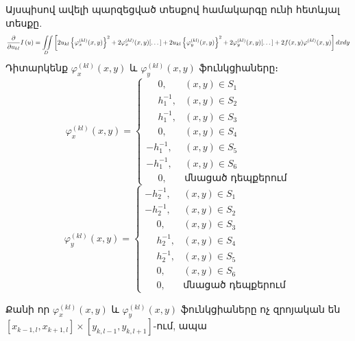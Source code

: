 \documentclass[fleqn, bachelor,subf,12pt,notitlepage]{article}
\newcommand\scalemath[2]{\scalebox{#1}{\mbox{\ensuremath{\displaystyle #2}}}}
\begin{document}
Այսպիսով ավելի պարզեցված տեսքով համակարգը ունի հետևյալ տեսքը.
$$\scalemath{0.75}{\frac{\partial}{\partial u_{kl}}I \left(u\right)= \iint \limits_{D} \left[2u_{kl}\left\{\varphi_{x}^{(kl)}(x,y)\right\}^{2} + 2\varphi_{x}^{(kl)}(x,y)[\dots] + 2u_{kl}\left\{\varphi_{y}^{(kl)}(x,y)\right\}^{2} + 2\varphi_{y}^{(kl)}(x,y)[\dots] + 2f(x,y)\varphi^{(kl)}(x,y)\right]dxdy}$$
Դիտարկենք $\varphi_{x}^{(kl)}(x,y) $ և $\varphi_{y}^{(kl)}(x,y) $ ֆունկցիաները։
\begin{equation}
\varphi_{x}^{(kl)}(x,y)  = \begin{cases}
\phantom{-}0, &(x,y) \in S_{1} \\
\phantom{-}h_{1}^{-1}, &(x,y) \in S_{2} \\
\phantom{-}h_{1}^{-1}, &(x,y) \in S_{3} \\
\phantom{-}0, &(x,y) \in S_{4} \\
-h_{1}^{-1}, &(x,y) \in S_{5} \\
-h_{1}^{-1}, &(x,y) \in S_{6}\\
\phantom{-}0, &\text{մնացած դեպքերում}
\end{cases}
\end{equation}
\begin{equation}
\varphi_{y}^{(kl)}(x,y)  = \begin{cases}
-h_{2}^{-1}, &(x,y) \in S_{1} \\
-h_{2}^{-1}, &(x,y) \in S_{2} \\
\phantom{-}0, &(x,y) \in S_{3} \\
\phantom{-}h_{2}^{-1}, &(x,y) \in S_{4} \\
\phantom{-}h_{2}^{-1}, &(x,y) \in S_{5} \\
\phantom{-}0, &(x,y) \in S_{6}\\
\phantom{-}0, &\text{մնացած դեպքերում}
\end{cases} \;
\end{equation}

Քանի որ $\varphi_{x}^{(kl)}(x,y) $ և $\varphi_{y}^{(kl)}(x,y) $ ֆունկցիաները ոչ զրոյական են $\left[x_{k-1, l}, x_{k+1, l} \right] \times \left[y_{k, l-1}, y_{k, l+1}\right]$-ում, ապա
\end{document}
